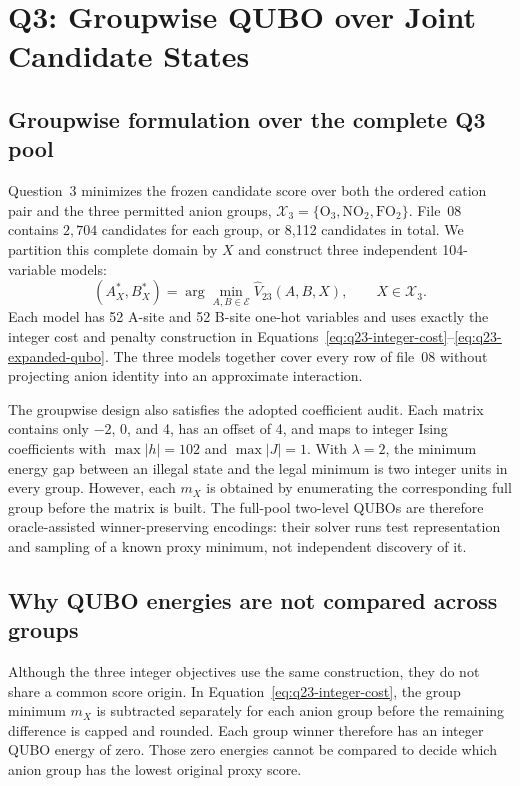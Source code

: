\section{Q3: Groupwise QUBO over Joint Candidate States}
\label{sec:q3-qubo}

\subsection{Groupwise formulation over the complete Q3 pool}

Question~3 minimizes the frozen candidate score over both the ordered
cation pair and the three permitted anion groups,
$\mathcal X_3=\{\mathrm{O}_3,\mathrm{NO}_2,\mathrm{FO}_2\}$.  File~08
contains $2,704$ candidates for each group, or 8,112 candidates in total.
We partition this complete domain by $X$ and construct three independent
104-variable models:
\begin{equation}
 (A_X^*,B_X^*)=
 \arg\min_{A,B\in\mathcal E}\widehat V_{23}(A,B,X),
 \qquad X\in\mathcal X_3.
 \label{eq:q3-group-objective}
\end{equation}
Each model has 52 A-site and 52 B-site one-hot variables and uses exactly
the integer cost and penalty construction in
Equations~\eqref{eq:q23-integer-cost}--\eqref{eq:q23-expanded-qubo}.  The
three models together cover every row of file~08 without projecting anion
identity into an approximate interaction.

The groupwise design also satisfies the adopted coefficient audit.
Each matrix contains only $-2$, 0, and 4, has an offset of 4, and maps to
integer Ising coefficients with $\max|h|=102$ and $\max|J|=1$.  With
$\lambda=2$, the minimum energy gap between an illegal state and the legal
minimum is two integer units in every group.  However, each $m_X$ is
obtained by enumerating the corresponding full group before the matrix is
built.  The full-pool two-level QUBOs are therefore oracle-assisted
winner-preserving encodings: their solver runs test representation and
sampling of a known proxy minimum, not independent discovery of it.

\subsection{Why QUBO energies are not compared across groups}

Although the three integer objectives use the same construction, they
do not share a common score origin.  In
Equation~\eqref{eq:q23-integer-cost}, the group minimum $m_X$ is subtracted
separately for each anion group before the remaining difference is capped
and rounded.  Each group winner therefore has an integer QUBO energy of
zero.  Those zero energies cannot be compared to decide which anion group
has the lowest original proxy score.

